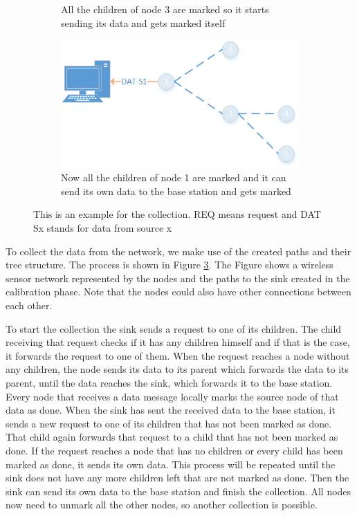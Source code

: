 \begin{figure}[htbp]
\begin{subfigure}[t]{0.4\textwidth}
        \caption{All the children of node 3 are marked so it starts sending its data and gets marked itself}
        \label{fig:coll8}
    \end{subfigure}
    \quad
    \quad
    \begin{subfigure}[t]{0.4\textwidth}
		\centering         
        \includegraphics[scale=0.6]{content/images/Collection/Part9}
        \caption{Now all the children of node 1 are marked and it can send its own data to the base station and gets marked}
        \label{fig:coll9}
    \end{subfigure}
    \caption{This is an example for the collection. REQ means request and DAT Sx stands for data from source x}
    \label{fig:coll}
\end{figure}

To collect the data from the network, we make use of the created paths and their tree structure. The process is shown in Figure \ref{fig:coll}. The Figure shows a wireless sensor network represented by the nodes and the paths to the sink created in the calibration phase. Note that the nodes could also have other connections between each other. 

To start the collection the sink sends a request to one of its children. The child receiving that request checks if it has any children himself and if that is the case, it forwards the request to one of them. When the request reaches a node without any children, the node sends its data to its parent which forwards the data to its parent, until the data reaches the sink, which forwards it to the base station. Every node that receives a data message locally marks the source node of that data as done. When the sink has sent the received data to the base station, it  sends a new request to one of its children that has not been marked as done. That child again forwards that request to a child that has not been marked as done. If the request reaches a node that has no children or every child has been marked as done, it sends its own data. This process will be repeated until the sink does not have any more children left that are not marked as done. Then the sink can send its own data to the base station and finish the collection. All nodes now need to unmark all the other nodes, so another collection is possible.

